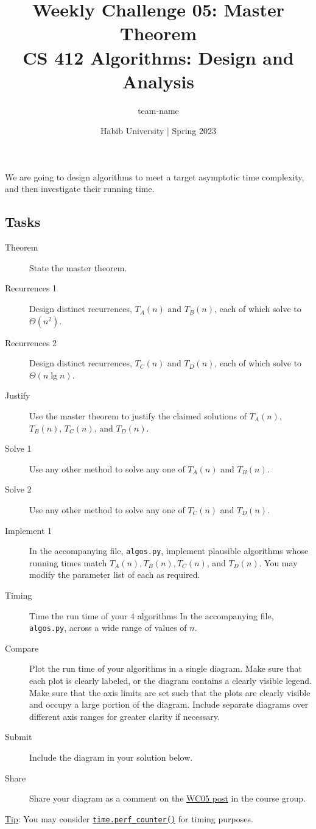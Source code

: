 \documentclass[a4paper]{exam}
\title{Weekly Challenge 05: Master Theorem\\CS 412 Algorithms: Design and Analysis}
\author{team-name}  %
\date{Habib University | Spring 2023}
\begin{document}
\maketitle

\begin{questions}

  

  We are going to design algorithms to meet a target asymptotic time complexity, and then investigate their running time.

  \subsection*{Tasks}
  \begin{description}
  \item[Theorem] State the master theorem.
  \item[Recurrences 1] Design distinct recurrences, $T_A(n)$ and $T_B(n)$, each of which solve to $\Theta(n^2)$.
  \item[Recurrences 2] Design distinct recurrences, $T_C(n)$ and $T_D(n)$, each of which solve to $\Theta(n\lg n)$.
  \item[Justify] Use the master theorem to justify the claimed solutions of  $T_A(n)$, $T_B(n)$, $T_C(n)$, and $T_D(n)$.
  \item[Solve 1] Use any other method to solve any one of  $T_A(n)$ and $T_B(n)$.
  \item[Solve 2] Use any other method to solve any one of  $T_C(n)$ and $T_D(n)$.
  \item[Implement 1] In the accompanying file, \texttt{algos.py}, implement plausible algorithms whose running times match $T_A(n),T_B(n), T_C(n)$, and $T_D(n)$. You may modify the parameter list of each as required.
  \item[Timing] Time the run time of your 4 algorithms In the accompanying file, \texttt{algos.py}, across a wide range of values of $n$.
  \item[Compare] Plot the run time of your algorithms in a single diagram. Make sure that each plot is clearly labeled, or the diagram contains a clearly visible legend. Make sure that the axis limits are set such that the plots are clearly visible and occupy a large portion of the diagram. Include separate diagrams over different axis ranges for greater clarity if necessary.
  \item[Submit] Include the diagram in your solution below.
  \item[Share] Share your diagram as a comment on the \href{https://web.yammer.com/main/org/habib.edu.pk/threads/eyJfdHlwZSI6IlRocmVhZCIsImlkIjoiMjEyMzI4NzkzMzY4MTY2NCJ9}{WC05 post} in the course group.
  \end{description}
  \underline{Tip}: You may consider \href{https://stackoverflow.com/a/68054319/1382487}{\texttt{time.perf_counter()}} for timing purposes.
  
  \begin{solution}
  \end{solution}

\end{questions}
\end{document}
